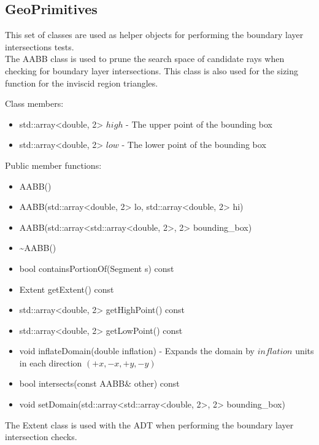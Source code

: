 \documentclass[manuscript, screen]{acmart}
\begin{document}
\subsection{GeoPrimitives}
This set of classes are used as helper objects for performing the boundary layer intersections tests.\\

The AABB class is used to prune the search space of candidate rays when checking for boundary layer intersections. This class is also used for the sizing function for the inviscid region triangles.

Class members:
\begin{itemize}
\item std::array<double, 2> $high$ - The upper point of the bounding box
\item std::array<double, 2> $low$ - The lower point of the bounding box
\end{itemize}

Public member functions:
\begin{itemize}
\item AABB()

\item AABB(std::array<double, 2> lo, std::array<double, 2> hi)

\item AABB(std::array<std::array<double, 2>, 2> bounding\_box)

\item \textasciitilde{}AABB()
%
\item bool containsPortionOf(Segment s) const

\item Extent getExtent() const

\item std::array<double, 2> getHighPoint() const

\item std::array<double, 2> getLowPoint() const

\item void inflateDomain(double inflation) - Expands the domain by $inflation$ units in each direction $(+x, -x, +y, -y)$

\item bool intersects(const AABB\& other) const

\item void setDomain(std::array<std::array<double, 2>, 2> bounding\_box)
\end{itemize}

The Extent class is used with the ADT when performing the boundary layer intersection checks.
\end{document}
